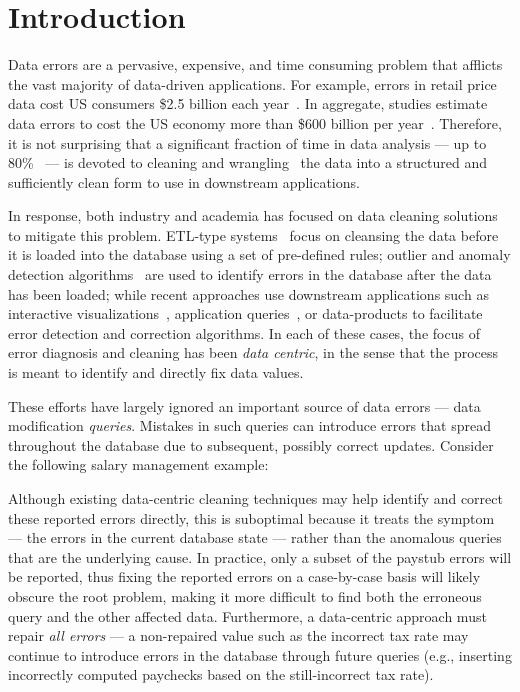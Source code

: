 
\section{Introduction}
\label{s:intro}

Data errors are a pervasive, expensive, and time consuming problem
that afflicts the vast majority of data-driven applications. For
example, errors in retail price data cost US consumers \$2.5 billion
each year~\cite{Fan2008}. In aggregate, studies estimate data errors
to cost the US economy more than \$600 billion per
year~\cite{eckerson2002}. Therefore, it is not surprising that a
significant fraction of time in data analysis --- up to
80\%~\cite{kandel2012} --- is devoted to cleaning and
wrangling~\cite{kandel2011wrangler} the data into a structured and
sufficiently clean form to use in downstream applications.

In response, both industry and academia has focused on data cleaning solutions to mitigate this problem.
ETL-type systems~\cite{krishnamurthy2009systemt, thomsen2005survey} focus on cleansing the data before it is loaded into the database
using a set of pre-defined rules; outlier and anomaly detection
 algorithms~\cite{chandola2007outlier} are used to identify errors
in the database after the data has been loaded; while recent approaches use downstream applications
such as interactive visualizations~\cite{kandel2011wrangler}, application queries~\cite{krishnan2015sampleclean}, or 
data-products to facilitate error detection and correction algorithms.
In each of these cases, the focus of error diagnosis and cleaning has been {\it data centric}, in the sense that
the process is meant to identify and directly fix data values.

These efforts have largely ignored an important source of data errors --- data modification {\it queries}.
Mistakes in such queries can introduce errors that spread throughout the database due to subsequent, possibly correct updates.
Consider the following salary management example:


%

Although existing data-centric cleaning techniques may help identify and correct these reported errors directly, 
this is suboptimal because it treats the symptom --- the errors in the current database state --- rather than the anomalous
queries that are the underlying cause.  In practice, only a subset of the paystub errors will be reported, thus fixing
the reported errors on a case-by-case basis will likely obscure the root problem, making it more difficult to
find both the erroneous query and the other affected data.  
Furthermore, a data-centric approach must repair \emph{all errors} --- a non-repaired value such as the incorrect tax rate
may continue to introduce errors in the database through future queries 
(e.g., inserting incorrectly computed paychecks based on the still-incorrect tax rate).

